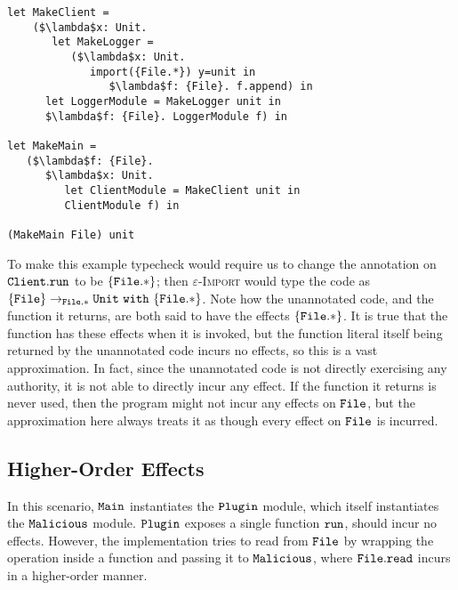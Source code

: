 \begin{lstlisting}
let MakeClient =
	($\lambda$x: Unit.
	   let MakeLogger =
	      ($\lambda$x: Unit.
	         import({File.*}) y=unit in
	            $\lambda$f: {File}. f.append) in
      let LoggerModule = MakeLogger unit in
      $\lambda$f: {File}. LoggerModule f) in

let MakeMain =
   ($\lambda$f: {File}.
      $\lambda$x: Unit.
         let ClientModule = MakeClient unit in
         ClientModule f) in

(MakeMain File) unit
\end{lstlisting}

To make this example typecheck would require us to change the annotation on $\mathtt{Client.run}$ to be $\mathtt{ \{ File.* \}}$; then \textsc{$\varepsilon$-Import} would type the code as $\mathtt{ \{ File \} \rightarrow_{\mathtt{File.*}}  \mathtt{Unit} ~\mathtt{with}~ \{ File.* \}}$. Note how the unannotated code, and the function it returns, are both said to have the effects $\{ \mathtt{File.*} \}$. It is true that the function has these effects when it is invoked, but the function literal itself being returned by the unannotated code incurs no effects, so this is a vast approximation. In fact, since the unannotated code is not directly exercising any authority, it is not able to directly incur any effect. If the function it returns is never used, then the program might not incur any effects on $\mathtt{File}$, but the approximation here always treats it as though every effect on $\mathtt{File}$ is incurred.































\subsection{Higher-Order Effects}

In this scenario, $\mathtt{Main}$ instantiates the $\mathtt{Plugin}$ module, which itself instantiates the $\mathtt{Malicious}$ module. $\mathtt{Plugin}$ exposes a single function $\mathtt{run}$, should incur no effects. However, the implementation tries to read from $\mathtt{File}$ by wrapping the operation inside a function and passing it to $\mathtt{Malicious}$, where $\mathtt{File.read}$ incurs in a higher-order manner.

